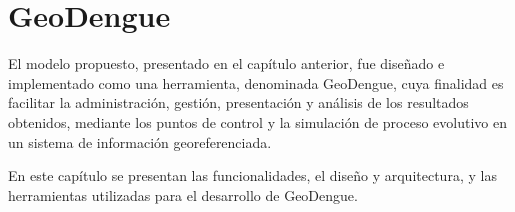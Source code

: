 \chapter{GeoDengue}
El modelo propuesto, presentado en el capítulo anterior, fue diseñado e implementado como una
herramienta, denominada GeoDengue, cuya finalidad es facilitar la administración, gestión,
presentación y análisis de los resultados obtenidos, mediante los puntos de control y la
simulación de proceso evolutivo en un sistema de información georeferenciada.

En este capítulo se presentan las funcionalidades, el diseño y arquitectura, y las herramientas
utilizadas para el desarrollo de GeoDengue.

%




%

